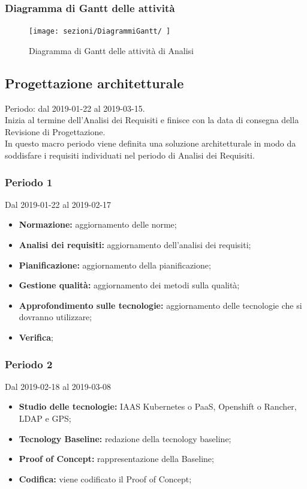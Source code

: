 \subsubsection{Diagramma di Gantt delle attività}
\begin{figure}[h]
	\texttt{[image: sezioni/DiagrammiGantt/  ]}
	\caption{Diagramma di Gantt delle attività di Analisi}
\end{figure}


\subsection{Progettazione architetturale}
Periodo: dal 2019-01-22 al 2019-03-15.
\\Inizia al termine dell'Analisi dei Requisiti e finisce con la data di consegna della Revisione di Progettazione.
\\In questo macro periodo viene definita una soluzione architetturale in modo da soddisfare i requisiti individuati nel periodo di Analisi dei Requisiti.

\subsubsection{Periodo 1} 
Dal 2019-01-22 al 2019-02-17
\begin{itemize}
	\item \textbf{Normazione:} aggiornamento delle norme;
	\item \textbf{Analisi dei requisiti:} aggiornamento dell'analisi dei requisiti;
	\item \textbf{Pianificazione:} aggiornamento della pianificazione;
	\item \textbf{Gestione qualità:} aggiornamento dei metodi sulla qualità;
	\item \textbf{Approfondimento sulle tecnologie:} aggiornamento delle tecnologie che si dovranno utilizzare;
	\item \textbf{Verifica};
\end{itemize}
\subsubsection{Periodo 2} 
Dal 2019-02-18 al 2019-03-08
\begin{itemize}
	\item \textbf{Studio delle tecnologie:} IAAS Kubernetes o PaaS, Openshift o Rancher, LDAP e GPS;
	\item \textbf{Tecnology Baseline:} redazione della tecnology baseline;
	\item \textbf{Proof of Concept:} rappresentazione della Baseline;
	\item \textbf{Codifica:} viene codificato il Proof of Concept;
\end{itemize}
